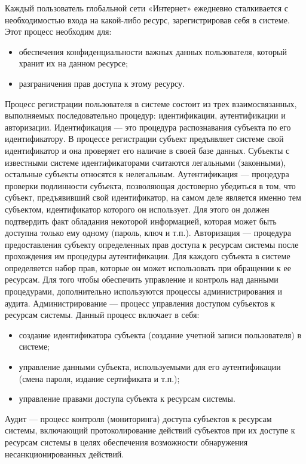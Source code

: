 \intro
Каждый пользователь глобальной сети «Интернет» ежедневно сталкивается с
необходимостью входа на какой-либо ресурс, зарегистрировав себя в системе. Этот
процесс необходим для:
\begin{itemize}
\item обеспечения конфиденциальности важных данных пользователя, который
хранит их на данном ресурсе;
\item разграничения прав доступа к этому ресурсу.
\end{itemize}
Процесс регистрации пользователя в системе состоит из трех взаимосвязанных,
выполняемых последовательно процедур: идентификации, аутентификации и
авторизации.
Идентификация --- это процедура распознавания субъекта по его идентификатору. В
процессе регистрации субъект предъявляет системе свой идентификатор и она
проверяет его наличие в своей базе данных. Субъекты с известными системе
идентификаторами считаются легальными (законными), остальные субъекты относятся
к нелегальным.
Аутентификация --- процедура проверки подлинности субъекта, позволяющая
достоверно убедиться в том, что субъект, предъявивший свой идентификатор, на
самом деле является именно тем субъектом, идентификатор которого он использует.
Для этого он должен подтвердить факт обладания некоторой информацией, которая
может быть доступна только ему одному (пароль, ключ и т.п.).
Авторизация --- процедура предоставления субъекту определенных прав доступа к
ресурсам системы после прохождения им процедуры аутентификации. Для каждого
субъекта в системе определяется набор прав, которые он может использовать при
обращении к ее ресурсам.
Для того чтобы обеспечить управление и контроль над данными процедурами,
дополнительно используются процессы администрирования и аудита.
Администрирование --- процесс управления доступом субъектов к ресурсам системы.
Данный процесс включает в себя:
\begin{itemize}
\item создание идентификатора субъекта (создание учетной записи пользователя) в
системе;
\item управление данными субъекта, используемыми для его аутентификации
(смена пароля, издание сертификата и т.п.);
\item управление правами доступа
субъекта к ресурсам системы.
\end{itemize}
Аудит --- процесс контроля (мониторинга) доступа субъектов к ресурсам системы,
включающий протоколирование действий субъектов при их доступе к ресурсам системы
в целях обеспечения возможности обнаружения несанкционированных действий.
